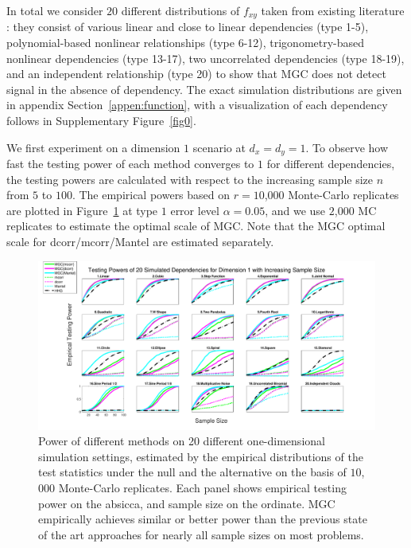 \documentclass[11pt]{article}
\begin{document}

In total we consider $20$ different distributions of $f_{xy}$ taken from existing literature \cite{SzekelyRizzoBakirov2007, SimonTibshirani2012, GorfineHellerHeller2012, HellerGorfine2013}: they consist of various linear and close to linear dependencies (type 1-5), polynomial-based nonlinear relationships (type 6-12), trigonometry-based nonlinear dependencies (type 13-17), two uncorrelated dependencies (type 18-19), and an independent relationship (type 20) to show that MGC does not detect signal in the absence of dependency. The exact simulation distributions are given in appendix Section~\ref{appen:function}, with a visualization of each dependency follows in Supplementary Figure~\ref{fig0}.

We first experiment on a dimension $1$ scenario at $d_{x}=d_{y}=1$. To observe how fast the testing power of each method converges to $1$ for different dependencies, the testing powers are calculated with respect to the increasing sample size $n$ from $5$ to $100$. The empirical powers based on $r=10$,$000$ Monte-Carlo replicates are plotted in Figure~\ref{fig:1D} at type $1$ error level $\alpha=0.05$, and we use $2$,$000$ MC replicates to estimate the optimal scale of MGC. Note that the MGC optimal scale for dcorr/mcorr/Mantel are estimated separately. 

\begin{figure}[htbp]
\includegraphics[width=1.0\textwidth]{../Figures/Fig1}
\caption{
Power of different methods on 20 different one-dimensional simulation settings, estimated by the empirical distributions of the test statistics under the null and the alternative on the basis of $10$,$000$ Monte-Carlo replicates.
Each panel shows empirical testing power on the absicca, and sample size on the ordinate.
MGC empirically achieves similar or better power than the previous state of the art approaches for nearly all sample sizes on most problems.}
\label{fig:1D}
\end{figure}
\end{document}

